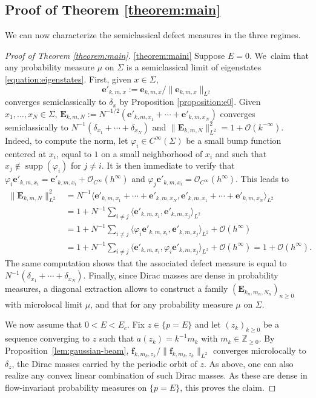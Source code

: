 \documentclass[10pt,a4paper]{amsart}
\newcommand{\bE}{\boldsymbol{E}}
\newcommand{\bme}{\boldsymbol{e}}
\newcommand{\bmf}{\boldsymbol{f}}
\theoremstyle{plain}
\theoremstyle{definition}
\let\mc\mathcal
\newcommand{\Z}{\mathbb{Z}}
\DeclareMathOperator{\supp}{supp}
\begin{document}
\subsection{Proof of Theorem \ref{theorem:main}} We can now characterize the semiclassical defect measures in the three regimes.

\skpt
\begin{proof}[Proof of Theorem \ref{theorem:main}]

\eqref{theorem:maini}
Suppose $E=0$. We~claim that any probability measure $\mu$ on $\Sigma$ is a semiclassical limit of eigenstates \eqref{equation:eigenstates}. First, given $x \in \Sigma$,
\[
\bme'_{k,m,x} := \bme_{k,m,x}/\|\bme_{k,m,x}\|_{L^2}
\]
converges semiclassically to $\delta_x$ by Proposition \ref{proposition:e0}. Given $x_1,\dots, x_N \in \Sigma$, $\bE_{k,m,N} := N^{-1/2}(\bme'_{k,m,x_1} +\cdots+ \bme'_{k,m,x_N})$ converges semiclassically to $N^{-1}(\delta_{x_1}+\cdots+\delta_{x_N})$ and $\|\bE_{k,m,N}\|^2_{L^2} = 1 + \mc{O}(k^{-\infty})$. Indeed, to compute the norm, let $\varphi_{i} \in C^\infty(\Sigma)$ be a small bump function centered at $x_i$, equal to $1$ on a small neighborhood of $x_i$ and such that $x_j \notin \supp(\varphi_i)$ for $j \neq i$. It is then immediate to verify that $\varphi_i \bme'_{k,m,x_i} = \bme'_{k,m,x_i} + \mc{O}_{C^\infty}(h^\infty)$ and $\varphi_j \bme'_{k,m,x_i} = \mc{O}_{C^\infty}(h^\infty)$. This leads to
\[
\begin{split}
\|\bE_{k,m,N}\|^2_{L^2} & = N^{-1}\langle \bme'_{k,m,x_1} +\cdots+ \bme'_{k,m,x_N}, \bme'_{k,m,x_1} +\cdots+ \bme'_{k,m,x_N}\rangle_{L^2} \\
& = 1 + N^{-1} \sum_{i \neq j} \langle \bme'_{k,m,x_i},\bme'_{k,m,x_j}\rangle_{L^2} \\
& = 1 + N^{-1} \sum_{i \neq j} \langle \varphi_i \bme'_{k,m,x_i},\bme'_{k,m,x_j}\rangle_{L^2} + \mc{O}(h^\infty) \\
& = 1 + N^{-1} \sum_{i \neq j} \langle \bme'_{k,m,x_i},\varphi_i \bme'_{k,m,x_j}\rangle_{L^2} + \mc{O}(h^\infty) = 1 + \mc{O}(h^\infty).
\end{split}
\]
The same computation shows that the associated defect measure is equal to \hbox{$N^{-1}(\delta_{x_1}+\cdots+\delta_{x_N})$}. Finally, since Dirac masses are dense in probability measures, a diagonal extraction allows to construct a family $(\bE_{k_n,m_n,N_n})_{n \geq 0}$ with microlocal limit $\mu$, and that for any probability measure $\mu$ on $\Sigma$.

We now assume that $0 < E < E_c$. Fix $z \in \{p=E\}$ and let $(z_k)_{k \geq 0}$ be a sequence converging to $z$ such that $a(z_k) = k^{-1}m_k$ with $m_k \in \Z_{\geq 0}$. By Proposition~\ref{lem:gaussian-beam}, $\bmf_{k,m_k,z_k}/\|\bmf_{k,m_k,z_k}\|_{L^2}$ converges microlocally to $\delta_z$, the Dirac masses carried by the periodic orbit of $z$. As above, one can also realize any convex linear combination of such Dirac masses. As these are dense in flow-invariant probability measures on $\{p=E\}$, this proves the claim.


\end{proof}
\end{document}
